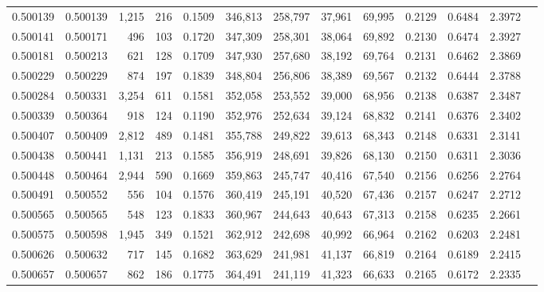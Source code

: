 \begin{tabular}{rrrrrrrrrrrrr}
0.500139 & 0.500139 & 1,215 &   216 &                                     0.1509 & 346,813 & 258,797 &  37,961 &  69,995 & 0.2129 & 0.6484 & 2.3972 \\
0.500141 & 0.500171 &   496 &   103 &                                     0.1720 & 347,309 & 258,301 &  38,064 &  69,892 & 0.2130 & 0.6474 & 2.3927 \\
0.500181 & 0.500213 &   621 &   128 &                                     0.1709 & 347,930 & 257,680 &  38,192 &  69,764 & 0.2131 & 0.6462 & 2.3869 \\
0.500229 & 0.500229 &   874 &   197 &                                     0.1839 & 348,804 & 256,806 &  38,389 &  69,567 & 0.2132 & 0.6444 & 2.3788 \\
0.500284 & 0.500331 & 3,254 &   611 &                                     0.1581 & 352,058 & 253,552 &  39,000 &  68,956 & 0.2138 & 0.6387 & 2.3487 \\
0.500339 & 0.500364 &   918 &   124 &                                     0.1190 & 352,976 & 252,634 &  39,124 &  68,832 & 0.2141 & 0.6376 & 2.3402 \\
0.500407 & 0.500409 & 2,812 &   489 &                                     0.1481 & 355,788 & 249,822 &  39,613 &  68,343 & 0.2148 & 0.6331 & 2.3141 \\
0.500438 & 0.500441 & 1,131 &   213 &                                     0.1585 & 356,919 & 248,691 &  39,826 &  68,130 & 0.2150 & 0.6311 & 2.3036 \\
0.500448 & 0.500464 & 2,944 &   590 &                                     0.1669 & 359,863 & 245,747 &  40,416 &  67,540 & 0.2156 & 0.6256 & 2.2764 \\
0.500491 & 0.500552 &   556 &   104 &                                     0.1576 & 360,419 & 245,191 &  40,520 &  67,436 & 0.2157 & 0.6247 & 2.2712 \\
0.500565 & 0.500565 &   548 &   123 &                                     0.1833 & 360,967 & 244,643 &  40,643 &  67,313 & 0.2158 & 0.6235 & 2.2661 \\
0.500575 & 0.500598 & 1,945 &   349 &                                     0.1521 & 362,912 & 242,698 &  40,992 &  66,964 & 0.2162 & 0.6203 & 2.2481 \\
0.500626 & 0.500632 &   717 &   145 &                                     0.1682 & 363,629 & 241,981 &  41,137 &  66,819 & 0.2164 & 0.6189 & 2.2415 \\
0.500657 & 0.500657 &   862 &   186 &                                     0.1775 & 364,491 & 241,119 &  41,323 &  66,633 & 0.2165 & 0.6172 & 2.2335 \\

\end{tabular}
